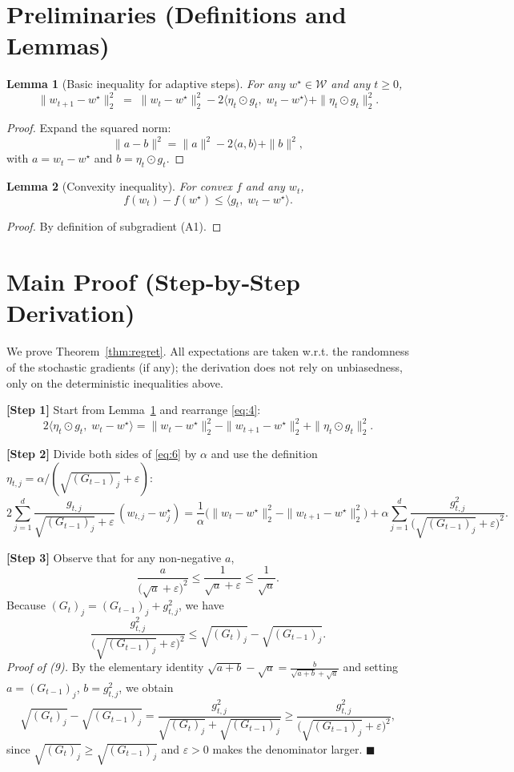 \documentclass{article}
\newtheorem{lemma}{Lemma}
\begin{document}
\section*{Preliminaries (Definitions and Lemmas)}
\begin{lemma}[Basic inequality for adaptive steps]\label{lem:basic}
For any $w^\star\in\mathcal{W}$ and any $t\ge0$,
\[
\|w_{t+1}-w^\star\|_2^2
\;=\;
\|w_{t}-w^\star\|_2^2
-2\langle\eta_t\odot g_t,\;w_t-w^\star\rangle
+\|\eta_t\odot g_t\|_2^2 .
\tag{4}
\]
\end{lemma}
\begin{proof}
Expand the squared norm:
\[
\|a-b\|^2=\|a\|^2-2\langle a,b\rangle+\|b\|^2,
\]
with $a=w_t-w^\star$ and $b=\eta_t\odot g_t$.
\end{proof}

\begin{lemma}[Convexity inequality]\label{lem:conv}
For convex $f$ and any $w_t$,
\[
f(w_t)-f(w^\star)\le\langle g_t,\;w_t-w^\star\rangle .
\tag{5}
\]
\end{lemma}
\begin{proof}
By definition of subgradient (A1). \end{proof}

\section*{Main Proof (Step‑by‑Step Derivation)}
We prove Theorem~\ref{thm:regret}.  All expectations are taken w.r.t.
the randomness of the stochastic gradients (if any); the derivation
does not rely on unbiasedness, only on the deterministic inequalities
above.

\noindent\textbf{[Step 1]}  Start from Lemma~\ref{lem:basic} and
rearrange \eqref{eq:4}:
\[
2\langle\eta_t\odot g_t,\;w_t-w^\star\rangle
=
\|w_{t}-w^\star\|_2^2-\|w_{t+1}-w^\star\|_2^2
+\|\eta_t\odot g_t\|_2^2 .
\tag{6}
\]

\noindent\textbf{[Step 2]}  Divide both sides of \eqref{eq:6} by
$\alpha$ and use the definition $\eta_{t,j}= \alpha/(\sqrt{(G_{t-1})_j}+\varepsilon)$:
\[
2\sum_{j=1}^{d}\frac{g_{t,j}}{\sqrt{(G_{t-1})_j}+\varepsilon}\,(w_{t,j}-w^\star_j)
=
\frac{1}{\alpha}\bigl(\|w_{t}-w^\star\|_2^2-\|w_{t+1}-w^\star\|_2^2\bigr)
+\alpha\sum_{j=1}^{d}\frac{g_{t,j}^2}{\bigl(\sqrt{(G_{t-1})_j}+\varepsilon\bigr)^2}.
\tag{7}
\]

\noindent\textbf{[Step 3]}  Observe that for any non‑negative $a$,
\[
\frac{a}{\bigl(\sqrt{a}+\varepsilon\bigr)^2}
\le \frac{1}{\sqrt{a}+\varepsilon}
\le\frac{1}{\sqrt{a}} .
\tag{8}
\]
Because $(G_{t})_j=(G_{t-1})_j+g_{t,j}^2$, we have
\[
\frac{g_{t,j}^2}{\bigl(\sqrt{(G_{t-1})_j}+\varepsilon\bigr)^2}
\le \sqrt{(G_{t})_j}-\sqrt{(G_{t-1})_j}.
\tag{9}
\]
\textit{Proof of (9).}  By the elementary identity
$\sqrt{a+b}-\sqrt{a}= \frac{b}{\sqrt{a+b}+\sqrt{a}}$ and setting
$a=(G_{t-1})_j$, $b=g_{t,j}^2$, we obtain
\[
\sqrt{(G_{t})_j}-\sqrt{(G_{t-1})_j}
=
\frac{g_{t,j}^2}{\sqrt{(G_{t})_j}+\sqrt{(G_{t-1})_j}}
\ge
\frac{g_{t,j}^2}{\bigl(\sqrt{(G_{t-1})_j}+\varepsilon\bigr)^2},
\]
since $\sqrt{(G_{t})_j}\ge\sqrt{(G_{t-1})_j}$ and $\varepsilon>0$ makes the
denominator larger. \hfill $\blacksquare$
\end{document}
